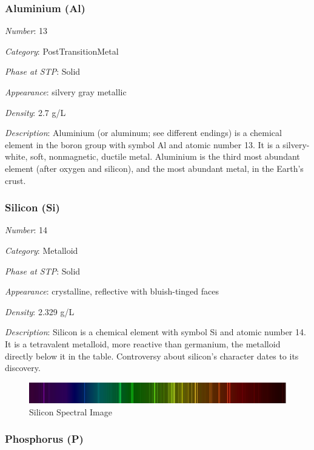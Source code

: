 \documentclass{article}
\begin{document}
\hypertarget{subsubsection::Al}{}\subsubsection{Aluminium (Al)}

\textit{Number}: 13

\textit{Category}: PostTransitionMetal

\textit{Phase at STP}: Solid

\textit{Appearance}: silvery gray metallic

\textit{Density}: 2.7 g/L

\textit{Description}: Aluminium (or aluminum; see different endings) is a chemical element in the boron group with symbol Al and atomic number 13. It is a silvery-white, soft, nonmagnetic, ductile metal. Aluminium is the third most abundant element (after oxygen and silicon), and the most abundant metal, in the Earth's crust.

\hypertarget{subsubsection::Si}{}\subsubsection{Silicon (Si)}

\textit{Number}: 14

\textit{Category}: Metalloid

\textit{Phase at STP}: Solid

\textit{Appearance}: crystalline, reflective with bluish-tinged faces

\textit{Density}: 2.329 g/L

\textit{Description}: Silicon is a chemical element with symbol Si and atomic number 14. It is a tetravalent metalloid, more reactive than germanium, the metalloid directly below it in the table. Controversy about silicon's character dates to its discovery.

\immediate{}
\begin{figure}[!ht]
    \centering
    \includegraphics[width=12cm]{./resources/spectral_img/Silicon_Spectra.jpg}
    \caption{Silicon Spectral Image}
\end{figure}

\hypertarget{subsubsection::P}{}\subsubsection{Phosphorus (P)}
\end{document}
